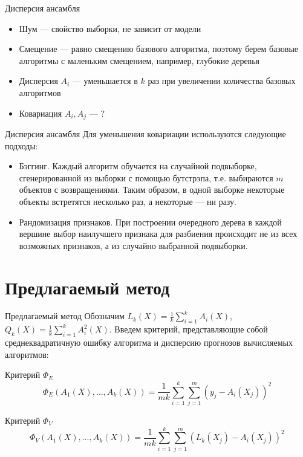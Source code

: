 \documentclass[10pt,pdf,hyperref={unicode}]{beamer}
\begin{document}
\begin{frame}{Дисперсия ансамбля}
    \begin{itemize}
        \item Шум --- свойство выборки, не зависит от модели
        \item Смещение --- равно смещению базового алгоритма, поэтому берем базовые алгоритмы с маленьким смещением, например, глубокие деревья
        \item Дисперсия $A_i$ --- уменьшается в $k$ раз при увеличении количества базовых алгоритмов
        \item Ковариация $A_i, A_j$ --- ?
    \end{itemize}
\end{frame}

\begin{frame}{Дисперсия ансамбля}
    Для уменьшения ковариации используются следующие подходы:
    \begin{itemize}
        \item Бэггинг. Каждый алгоритм обучается на случайной подвыборке, сгенерированной из выборки с помощью бутстрэпа, т.е. выбираются $m$ объектов с возвращениями. Таким образом, в одной выборке некоторые объекты встретятся несколько раз, а некоторые — ни разу.
        \item Рандомизация признаков. При построении очередного дерева в каждой вершине выбор наилучшего признака для разбиения происходит не из всех возможных признаков, а из случайно выбранной подвыборки. 
    \end{itemize}
\end{frame}

\section{Предлагаемый метод}
\begin{frame}{Предлагаемый метод}
    Обозначим $L_k(X) = \frac{1}{k}\sum_{i = 1}^{k} A_i(X)$, $Q_k(X) = \frac{1}{k}\sum_{i = 1}^{k} A_i^2(X)$. Введем критерий, представляющие собой среднеквадратичную ошибку алгоритма и дисперсию прогнозов вычисляемых алгоритмов:
\begin{block}{Критерий $\Phi_E$}
    \begin{equation*}
    \Phi_E(A_1(X), \dots, A_k(X)) = \frac{1}{mk} \sum_{i=1}^{k} \sum_{j=1}^{m} (y_j - A_i(X_j))^2
    \end{equation*}
\end{block}
\begin{block}{Критерий $\Phi_V$}
    \begin{equation*}
    \Phi_V(A_1(X), \dots, A_k(X)) = \frac{1}{mk} \sum_{i=1}^{k} \sum_{j=1}^{m} (L_k(X_j) - A_i(X_j))^2
    \end{equation*}
\end{block}

\end{frame}
\end{document}

